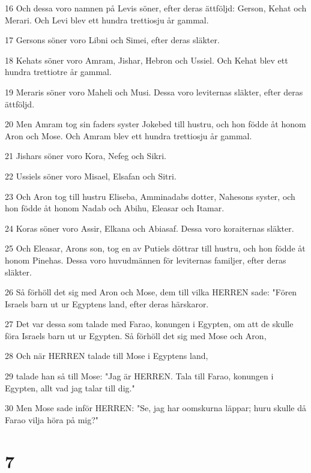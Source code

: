 \par 16 Och dessa voro namnen på Levis söner, efter deras ättföljd: Gerson, Kehat och Merari. Och Levi blev ett hundra trettiosju år gammal.
\par 17 Gersons söner voro Libni och Simei, efter deras släkter.
\par 18 Kehats söner voro Amram, Jishar, Hebron och Ussiel. Och Kehat blev ett hundra trettiotre år gammal.
\par 19 Meraris söner voro Maheli och Musi. Dessa voro leviternas släkter, efter deras ättföljd.
\par 20 Men Amram tog sin faders syster Jokebed till hustru, och hon födde åt honom Aron och Mose. Och Amram blev ett hundra trettiosju år gammal.
\par 21 Jishars söner voro Kora, Nefeg och Sikri.
\par 22 Ussiels söner voro Misael, Elsafan och Sitri.
\par 23 Och Aron tog till hustru Eliseba, Amminadabs dotter, Nahesons syster, och hon födde åt honom Nadab och Abihu, Eleasar och Itamar.
\par 24 Koras söner voro Assir, Elkana och Abiasaf. Dessa voro koraiternas släkter.
\par 25 Och Eleasar, Arons son, tog en av Putiels döttrar till hustru, och hon födde åt honom Pinehas. Dessa voro huvudmännen för leviternas familjer, efter deras släkter.
\par 26 Så förhöll det sig med Aron och Mose, dem till vilka HERREN sade: "Fören Israels barn ut ur Egyptens land, efter deras härskaror.
\par 27 Det var dessa som talade med Farao, konungen i Egypten, om att de skulle föra Israels barn ut ur Egypten. Så förhöll det sig med Mose och Aron,
\par 28 Och när HERREN talade till Mose i Egyptens land,
\par 29 talade han så till Mose: "Jag är HERREN. Tala till Farao, konungen i Egypten, allt vad jag talar till dig."
\par 30 Men Mose sade inför HERREN: "Se, jag har oomskurna läppar; huru skulle då Farao vilja höra på mig?"

\chapter{7}

